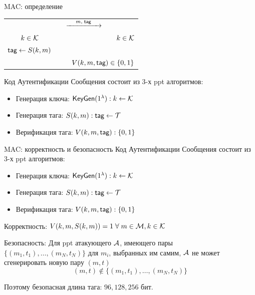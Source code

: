 \documentclass[usenames,dvipsnames,8pt,aspectratio=169]{beamer}
\begin{document}
\begin{frame}{MAC: определение}
\begin{center}
\begin{tabular}{c c c c c}
		&  & \Huge $\xrightarrow{\mkern25mu m, \; \textsf{tag} \mkern25mu}$ & &  \\ 
		\LARGE $k \in \mathcal{K}$ &   & &  & $k \in \mathcal{K}$ \\[10pt]
		$\textsf{tag} \leftarrow S(k,m)$   & & &  &    \\ [20pt] 
		\multicolumn{5}{r}{$V(k,m, \textsf{tag}) \in \{ 0, 1\}$ }  \\
	\end{tabular}
\end{center}
\pause
\large
{\color{Orange} Код Аутентификации Сообщения } состоит из 3-х ppt алгоритмов:
\vspace{-2pt}
\begin{itemize}
	\item Генерация ключа: $\textsf{KeyGen}(1^\lambda): k \leftarrow \mathcal{K}$ \\[4pt]
	\item Генерация тага: $S(k, m): \textsf{tag} \leftarrow \mathcal{T}$ \\[4pt]
	\item Верификация тага: $V(k, m, \textsf{tag}): \{0, 1\}  $
\end{itemize}
\end{frame}

\begin{frame}{MAC: корректность и безопасность}
\Large
{\color{Orange} Код Аутентификации Сообщения } состоит из 3-х ppt алгоритмов:
\vspace{-2pt}
\begin{itemize}
	\item Генерация ключа: $\textsf{KeyGen}(1^\lambda): k \leftarrow \mathcal{K}$ \\[4pt]
	\item Генерация тага: $S(k, m): \textsf{tag} \leftarrow \mathcal{T}$ \\[4pt]
	\item Верификация тага: $V(k, m, \textsf{tag}): \{0, 1\}  $
\end{itemize}

\vspace{10pt}
{\color{Orange} Корректность:} \LARGE 
$ V(k, m, S(k,m)) = 1 \; \forall \; m \in \mathcal{M}, k \in \mathcal{K} $

\vspace{10pt}
{\color{Orange}Безопасность:}
Для ppt атакующего $\mathcal{A}$, имеющего пары $\{(m_1, t_1), \ldots, (m_N, t_N) \}$ для $m_i$, выбранных им самим, $\mathcal{A}$ не может сгенерировать новую пару  $(m,t)$
\[(m,t) \notin \{(m_1, t_1), \ldots, (m_N, t_N) \}\]

\vspace{10pt}

Поэтому безопасная длина тага: $96, 128, 256 $ бит.
\end{frame}
\end{document}

